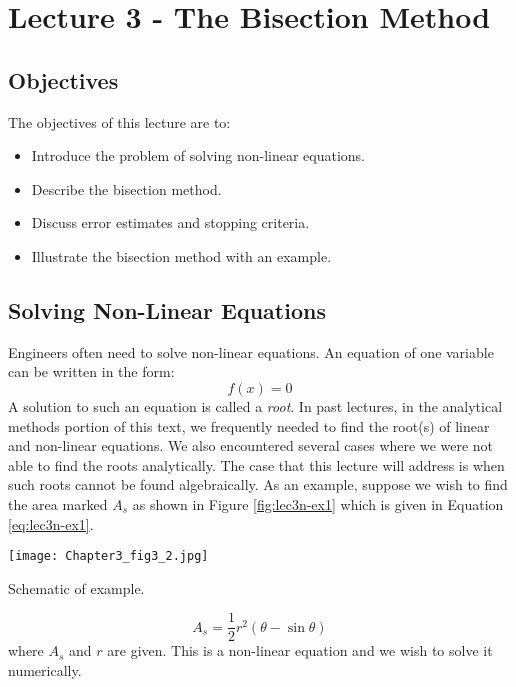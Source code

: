 \chapter{Lecture 3 - The Bisection Method}
\label{ch:lec3n}
\section{Objectives}
The objectives of this lecture are to:
\begin{itemize}
\item Introduce the problem of solving non-linear equations.
\item Describe the bisection method.
\item Discuss error estimates and stopping criteria.
\item Illustrate the bisection method with an example.
\end{itemize}
\setcounter{lstannotation}{0}

\section{Solving Non-Linear Equations}
Engineers often need to solve non-linear equations.  An equation of one variable can be written in the form:
\begin{equation}
f(x) = 0
\end{equation}
A solution to such an equation is called a \emph{root}.  In past lectures, in the analytical methods portion of this text, we frequently needed to find the root(s) of linear and non-linear equations.  We also encountered several cases where we were not able to find the roots analytically.
The case that this lecture will address is when such roots cannot be found algebraically.  As an example, suppose we wish to find the area marked $A_s$ as shown in Figure \ref{fig:lec3n-ex1} which is given in Equation \ref{eq:lec3n-ex1}.
\begin{marginfigure}
\texttt{[image: Chapter3\_fig3\_2.jpg]}
\caption{Schematic of example.}
\label{fig:lec3n-ex1}
\end{marginfigure}
\begin{equation}
A_s = \frac{1}{2}r^2\left(\theta - \sin{\theta}\right)
\label{eq:lec3n-ex1}
\end{equation}
where $A_s$ and $r$ are given.  This is a non-linear equation and we wish to solve it numerically.

